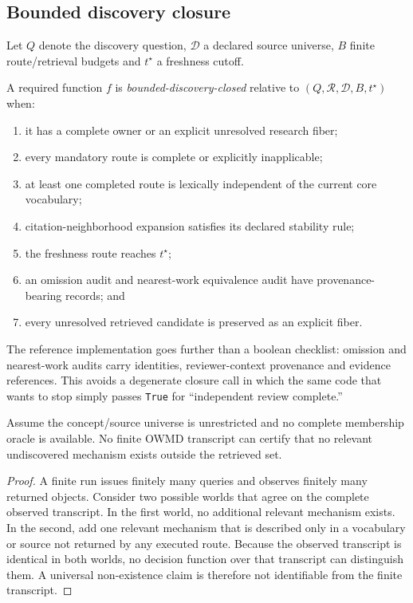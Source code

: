 \subsection{Bounded discovery closure}

Let \(Q\) denote the discovery question, \(\mathcal D\) a declared source universe, \(B\) finite route/retrieval budgets and \(t^\star\) a freshness cutoff.

\begin{definition}
A required function \(f\) is \emph{bounded-discovery-closed} relative to \((Q,\mathcal R,\mathcal D,B,t^\star)\) when:
\begin{enumerate}[leftmargin=*]
\item it has a complete owner or an explicit unresolved research fiber;
\item every mandatory route is complete or explicitly inapplicable;
\item at least one completed route is lexically independent of the current core vocabulary;
\item citation-neighborhood expansion satisfies its declared stability rule;
\item the freshness route reaches \(t^\star\);
\item an omission audit and nearest-work equivalence audit have provenance-bearing records; and
\item every unresolved retrieved candidate is preserved as an explicit fiber.
\end{enumerate}
\end{definition}

The reference implementation goes further than a boolean checklist: omission and nearest-work audits carry identities, reviewer-context provenance and evidence references. This avoids a degenerate closure call in which the same code that wants to stop simply passes \texttt{True} for ``independent review complete.''

\begin{theorem}
Assume the concept/source universe is unrestricted and no complete membership oracle is available. No finite OWMD transcript can certify that no relevant undiscovered mechanism exists outside the retrieved set.
\end{theorem}

\begin{proof}
A finite run issues finitely many queries and observes finitely many returned objects. Consider two possible worlds that agree on the complete observed transcript. In the first world, no additional relevant mechanism exists. In the second, add one relevant mechanism that is described only in a vocabulary or source not returned by any executed route. Because the observed transcript is identical in both worlds, no decision function over that transcript can distinguish them. A universal non-existence claim is therefore not identifiable from the finite transcript.
\end{proof}

